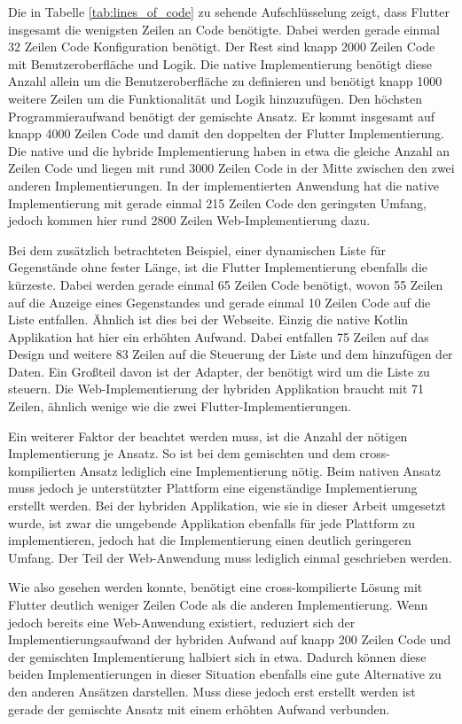 Die in Tabelle \ref{tab:lines_of_code} zu sehende Aufschlüsselung zeigt, dass Flutter insgesamt die wenigsten Zeilen an Code benötigte. 
Dabei werden gerade einmal 32 Zeilen Code Konfiguration benötigt. 
Der Rest sind knapp 2000 Zeilen Code mit Benutzeroberfläche und Logik. Die native Implementierung benötigt diese Anzahl allein um die Benutzeroberfläche zu definieren und benötigt knapp 1000 weitere Zeilen um die Funktionalität und Logik hinzuzufügen. 
Den höchsten Programmieraufwand benötigt der gemischte Ansatz. Er kommt insgesamt auf knapp 4000 Zeilen Code und damit den doppelten der Flutter Implementierung. Die native und die hybride Implementierung haben in etwa die gleiche Anzahl an Zeilen Code und liegen mit rund 3000 Zeilen Code in der Mitte zwischen den zwei anderen Implementierungen.
In der implementierten Anwendung hat die native Implementierung mit gerade einmal 215 Zeilen Code den geringsten Umfang, jedoch kommen hier rund 2800 Zeilen Web-Implementierung dazu.

Bei dem zusätzlich betrachteten Beispiel, einer dynamischen Liste für Gegenstände ohne fester Länge, ist die Flutter Implementierung ebenfalls die kürzeste. Dabei werden gerade einmal 65 Zeilen Code benötigt, wovon 55 Zeilen auf die Anzeige eines Gegenstandes und gerade einmal 10 Zeilen Code auf die Liste entfallen. Ähnlich ist dies bei der Webseite. Einzig die native Kotlin Applikation hat hier ein erhöhten Aufwand. Dabei entfallen 75 Zeilen auf das Design und weitere 83 Zeilen auf die Steuerung der Liste und dem hinzufügen der Daten. Ein Großteil davon ist der Adapter, der benötigt wird um die Liste zu steuern. Die Web-Implementierung der hybriden Applikation braucht mit 71 Zeilen, ähnlich wenige wie die zwei Flutter-Implementierungen.

Ein weiterer Faktor der beachtet werden muss, ist die Anzahl der nötigen Implementierung je Ansatz. So ist bei dem gemischten und dem cross-kompilierten Ansatz lediglich eine Implementierung nötig. Beim nativen Ansatz muss jedoch je unterstützter Plattform eine eigenständige Implementierung erstellt werden. Bei der hybriden Applikation, wie sie in dieser Arbeit umgesetzt wurde, ist zwar die umgebende Applikation ebenfalls für jede Plattform zu implementieren, jedoch hat die Implementierung einen deutlich geringeren Umfang. Der Teil der Web-Anwendung muss lediglich einmal geschrieben werden.  

Wie also gesehen werden konnte, benötigt eine cross-kompilierte Lösung mit Flutter deutlich weniger Zeilen Code als die anderen Implementierung.
Wenn jedoch bereits eine Web-Anwendung existiert, reduziert sich der Implementierungsaufwand der hybriden Aufwand auf knapp 200 Zeilen Code und der gemischten Implementierung halbiert sich in etwa. Dadurch können diese beiden Implementierungen in dieser Situation ebenfalls eine gute Alternative zu den anderen Ansätzen darstellen. Muss diese jedoch erst erstellt werden ist gerade der gemischte Ansatz mit einem erhöhten Aufwand verbunden.

